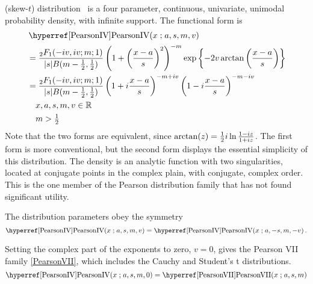 

\clearpage
{}
\label{sec:PearsonIV}

 (skew-$t$) distribution~\cite{Pearson1895,Heinrich2004}
is a four parameter, continuous, univariate, unimodal probability density, with infinite support. The functional form is
\begin{align}
\label{PearsonIV}
& \opr{PearsonIV}(x\given a,s, m,v) 
\\ \notag &= \frac{{}_{2}F_1(-i v, i v ; m;1)  }{|s| B(m-\frac{1}{2}, \frac{1}{2} )}  
\left( 1 +\left( \frac{x-a}{s}\right)^2 \right)^{-m}  \exp \left\{ - 2 v \arctan \left( \frac{x-a}{s}\right) \right\}
\checked
\\ \notag &=  \frac{{}_{2}F_1(-i v, i v ; m;1)  }{|s| B(m-\frac{1}{2}, \frac{1}{2} )} 
\left( 1 + i \frac{x-a}{s} \right)^{-m+iv} \left( 1 -i \frac{x-a}{s} \right)^{-m-iv}
\checked
\\ \notag & \quad x,a,s,m,v \in {\mathbb R} 
\\ \notag & \quad m>\tfrac{1}{2}
\end{align}
Note that the two forms are equivalent, since $\arctan(z) = \tfrac{1}{2} i \ln \frac{1-i z}{1+iz}$. The first form is more conventional, but the second form displays  the essential simplicity of this distribution. The density is an analytic function with two singularities, located at conjugate points in  the complex plain, with conjugate, complex order. This is the one member of the Pearson distribution family that has not found  significant utility.



The distribution parameters obey the symmetry 
\[
\opr{PearsonIV}(x\given a,s, m,v) =\opr{PearsonIV}(x\given a,-s, m,-v)\, .\checked
\notag
\] 

Setting the complex part of the exponents to zero, $v=0$, gives the Pearson VII family \eqref{PearsonVII}, which includes the Cauchy and Student's t distributions. 
\[
\opr{PearsonIV}(x\given a,s, m,0) = \opr{PearsonVII}(x\given a,s, m)  \checked
\notag
\]

